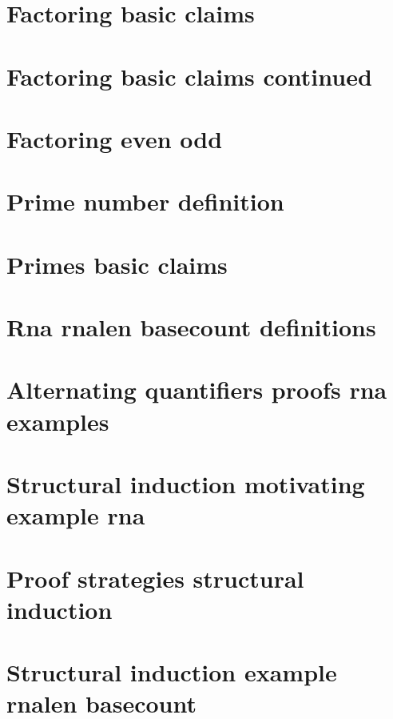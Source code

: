 \section*{Factoring basic claims}

\vfill
\section*{Factoring basic claims continued}

\vfill
\section*{Factoring even odd}

\vfill
\section*{Prime number definition}

\vfill
\section*{Primes basic claims}

\vfill
\section*{Rna rnalen basecount definitions}

\vfill
\section*{Alternating quantifiers proofs rna examples}

\vfill
\section*{Structural induction motivating example rna}

\vfill
\section*{Proof strategies structural induction}

\vfill
\section*{Structural induction example rnalen basecount}

\vfill

